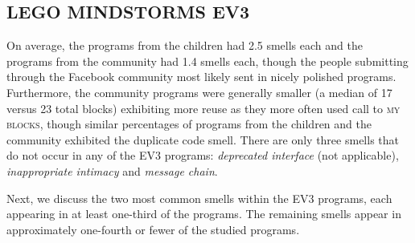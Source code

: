 \documentclass[conference]{IEEEtran}
\newcommand{\ms}{LEGO MINDSTORMS EV3}
\newcommand{\mbs}{\textsc{my blocks}}
\begin{document}


\subsection{\ms}
On average, the programs from the children had 2.5 smells each and the programs from the community  had 1.4 smells each, though  the people submitting through the Facebook community most likely sent in nicely polished programs. Furthermore, the community programs were generally smaller (a median of 17 versus 23 total blocks) exhibiting more reuse as they more often used call to \mbs, though similar percentages of programs from the children and the community exhibited the duplicate code smell.  There are only three smells that do not occur in any of the EV3 programs: \emph{deprecated interface} (not applicable), \emph{inappropriate intimacy} and \emph{message chain}.

Next, we discuss the two most common smells within the EV3 programs, each appearing in at least one-third of the programs. The remaining smells appear in approximately one-fourth or fewer of the studied programs. 

\end{document}
